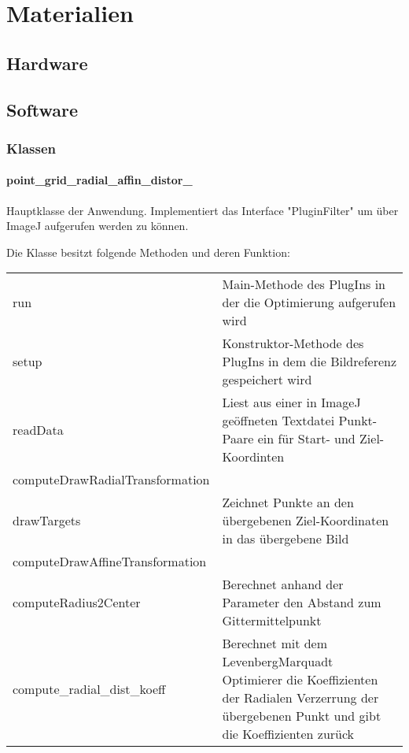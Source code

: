 
\section{Materialien}\label{sec:Materials}

\subsection{Hardware}\label{sec:Hardware}
\subsection{Software}

\subsubsection{Klassen}

\paragraph{point_grid_radial_affin_distor_}
Hauptklasse der Anwendung. Implementiert das Interface "PluginFilter" um über ImageJ aufgerufen werden zu können.

Die Klasse besitzt folgende Methoden und deren Funktion:

\begin{tabular}{p{} | p{}} 
\caption{Methoden der point_grid_radial_affin_distor_ Klasse}
run & Main-Methode des PlugIns in der die Optimierung aufgerufen wird\\
setup & Konstruktor-Methode des PlugIns in dem die Bildreferenz gespeichert wird\\
readData & Liest aus einer in ImageJ geöffneten Textdatei Punkt-Paare ein für Start- und Ziel-Koordinten\\
computeDrawRadialTransformation & \\
drawTargets & Zeichnet Punkte an den übergebenen Ziel-Koordinaten in das übergebene Bild\\
computeDrawAffineTransformation & \\
computeRadius2Center & Berechnet anhand der Parameter den Abstand zum Gittermittelpunkt\\
compute_radial_dist_koeff & Berechnet mit dem LevenbergMarquadt Optimierer die Koeffizienten der Radialen Verzerrung der übergebenen Punkt und gibt die Koeffizienten zurück\\
\end{tabular}

